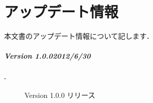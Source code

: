 \section{アップデート情報}
本文書のアップデート情報について記します．\\

\subparagraph{Version 1.0.0\hspace{1cm}2012/6/30}

\begin{description}
\item[-] Version 1.0.0 リリース
\end{description}
\vspace{3mm}

\clearpage
